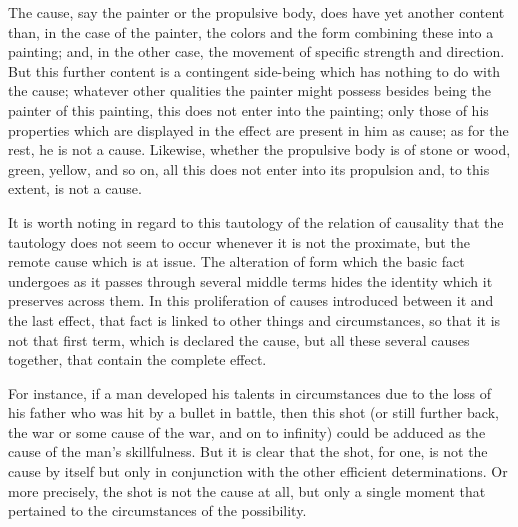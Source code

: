 The cause, say the painter or the propulsive body,
does have yet another content than,
in the case of the painter,
the colors and the form combining
these into a painting;
and, in the other case,
the movement of specific strength and direction.
But this further content is a contingent side-being
which has nothing to do with the cause;
whatever other qualities the painter
might possess besides being the painter of this painting,
this does not enter into the painting;
only those of his properties
which are displayed in the effect
are present in him as cause;
as for the rest, he is not a cause.
Likewise, whether the propulsive body is
of stone or wood, green, yellow, and so on,
all this does not enter into its propulsion
and, to this extent, is not a cause.

It is worth noting in regard to
this tautology of the relation of causality
that the tautology does not seem to occur
whenever it is not the proximate,
but the remote cause which is at issue.
The alteration of form
which the basic fact undergoes
as it passes through several middle terms
hides the identity which it preserves across them.
In this proliferation of causes
introduced between it and the last effect,
that fact is linked to other things
and circumstances,
so that it is not that first term,
which is declared the cause,
but all these several causes together,
that contain the complete effect.

For instance, if a man developed his talents
in circumstances due to the loss of his father
who was hit by a bullet in battle, then this shot
(or still further back,
the war or some cause of the war,
and on to infinity)
could be adduced as the cause of the man's skillfulness.
But it is clear that the shot, for one,
is not the cause by itself
but only in conjunction with the
other efficient determinations.
Or more precisely, the shot is not the cause at all,
but only a single moment that pertained to
the circumstances of the possibility.

